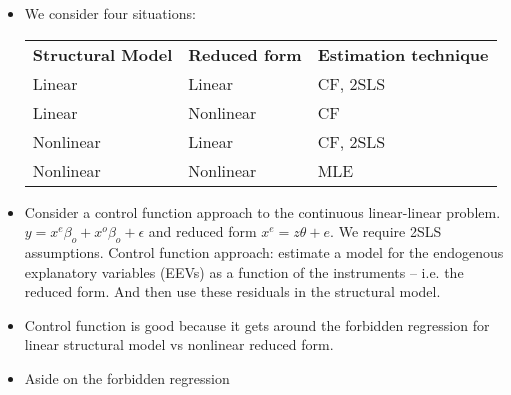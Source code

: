 \documentclass[12pt]{article}
\begin{document}
\begin{itemize}
    \item We consider four situations:
          \begin{table}[htbp]
              \centering\begin{tabular}{ l l l }
                  \textbf{Structural Model} & \textbf{Reduced form} & \textbf{Estimation technique} \\  [0.5ex]
                  Linear                    & Linear                & CF, 2SLS                      \\
                  Linear                    & Nonlinear             & CF                            \\
                  Nonlinear                 & Linear                & CF, 2SLS                      \\
                  Nonlinear                 & Nonlinear             & MLE
              \end{tabular}

          \end{table}

    \item Consider a control function approach to the continuous linear-linear problem.
          $y = x^{e}\beta_{o} + x^{o}\beta_{o} + \epsilon$ and reduced form $x^{e} = z \theta + e $.
          We require 2SLS assumptions.
          Control function approach: estimate a model for the endogenous explanatory variables (EEVs)
          as a function of the instruments -- i.e. the reduced form.
          And then use these residuals in the structural model.
    \item Control function is good because it gets around the forbidden regression for linear structural model
          vs nonlinear reduced form.

    \item Aside on the forbidden regression




\end{itemize}
\end{document}

